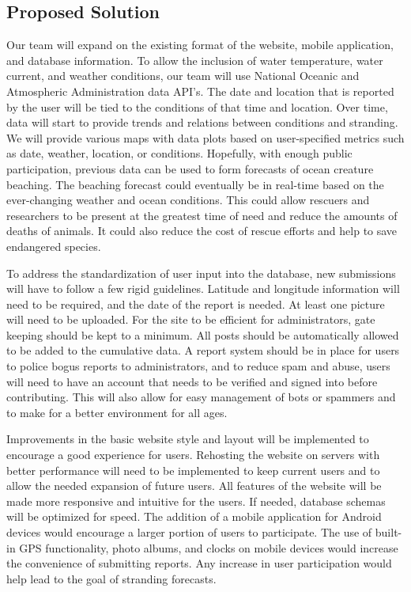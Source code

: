 \documentclass[onecolumn, draftclsnofoot,10pt, compsoc]{IEEEtran}
\begin{document}
\begin{singlespace}
\section{Proposed Solution}
		Our team will expand on the existing format of the website, mobile application, and database information.  
		To allow the inclusion of water temperature, water current, and weather conditions, our team will use National Oceanic and Atmospheric Administration data API's.
		The date and location that is reported by the user will be tied to the conditions of that time and location.  Over time, data will start to provide trends and relations
		between conditions and stranding.  We will provide various maps with data plots based on user-specified metrics such as date, weather, location, or conditions.
		Hopefully, with enough public participation, previous data can be used to form forecasts of ocean creature beaching.  The beaching forecast could eventually be in
		real-time based on the ever-changing weather and ocean conditions.  This could allow rescuers and researchers to
		be present at the greatest time of need and reduce the amounts of deaths of animals. It could also reduce the cost of rescue efforts and help to save endangered species.
		
		To address the standardization of user input into the database, new submissions will have to follow a few rigid guidelines.  Latitude and longitude information will need to 
		be required, and the date of the report is needed.  At least one picture will need to be uploaded. 
		For the site to be efficient for administrators, gate keeping should be kept to a minimum.  All posts should be automatically allowed to be 
		added to the cumulative data.  A report system should be in place for users to police bogus reports to administrators, and to reduce spam and abuse, users will need to 
		have an account that needs to be verified and signed into before contributing.  This will also allow for easy management of bots or spammers and to make for a better
		environment for all ages.

		Improvements in the basic website style and layout will be implemented to encourage a good experience for users.  Rehosting the website on servers with better performance
		will need to be implemented to keep current users and to allow the needed expansion of future users.  All features of the website will be made more responsive and intuitive
		for the users.  If needed, database schemas will be optimized for speed.
		The addition of a mobile application for Android devices would encourage a larger portion of users to participate.  The use of built-in GPS functionality, photo albums,
		and clocks on mobile devices would increase the convenience of submitting reports.  Any increase in user participation would help lead to the goal of stranding forecasts.


\end{singlespace}
\end{document}
